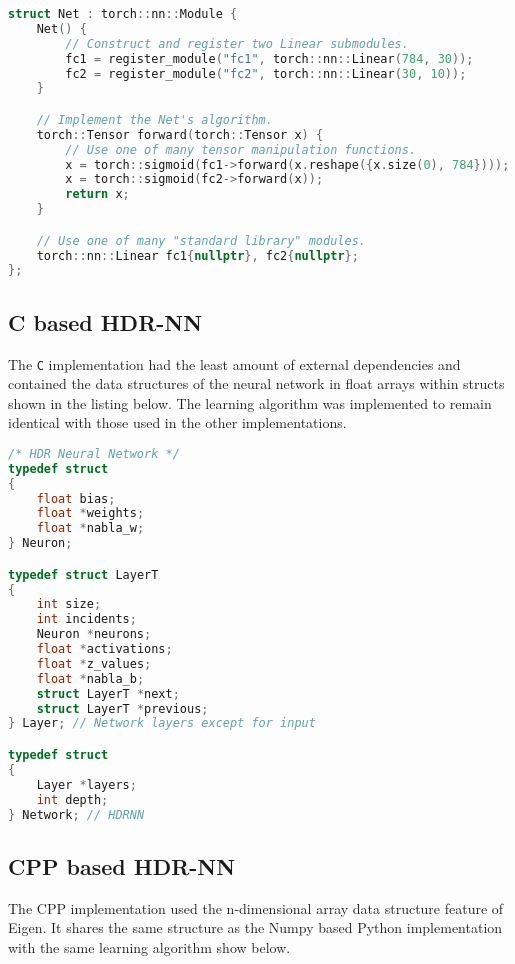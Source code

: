 \begin{lstlisting}[language=C++]
struct Net : torch::nn::Module {
	Net() {
		// Construct and register two Linear submodules.
		fc1 = register_module("fc1", torch::nn::Linear(784, 30));
		fc2 = register_module("fc2", torch::nn::Linear(30, 10));
	}

	// Implement the Net's algorithm.
	torch::Tensor forward(torch::Tensor x) {
		// Use one of many tensor manipulation functions.
		x = torch::sigmoid(fc1->forward(x.reshape({x.size(0), 784})));
		x = torch::sigmoid(fc2->forward(x));
		return x;
	}

	// Use one of many "standard library" modules.
	torch::nn::Linear fc1{nullptr}, fc2{nullptr};
};
\end{lstlisting}


\subsection{C based HDR-NN}

The \texttt{C} implementation had the least amount of external dependencies and contained the data structures of the neural network in float arrays within structs shown in the listing below. The learning algorithm was implemented to remain identical with those used in the other implementations.

\begin{lstlisting}[language=C]
/* HDR Neural Network */
typedef struct
{
	float bias;
	float *weights;
	float *nabla_w;
} Neuron;

typedef struct LayerT
{
	int size;
	int incidents;
	Neuron *neurons;
	float *activations;
	float *z_values;
	float *nabla_b;
	struct LayerT *next;
	struct LayerT *previous;
} Layer; // Network layers except for input

typedef struct
{
	Layer *layers;
	int depth;
} Network; // HDRNN
\end{lstlisting}

\subsection{CPP based HDR-NN}

The CPP implementation used the n-dimensional array data structure feature of Eigen. It shares the same structure as the Numpy based Python implementation with the same learning algorithm show below.

